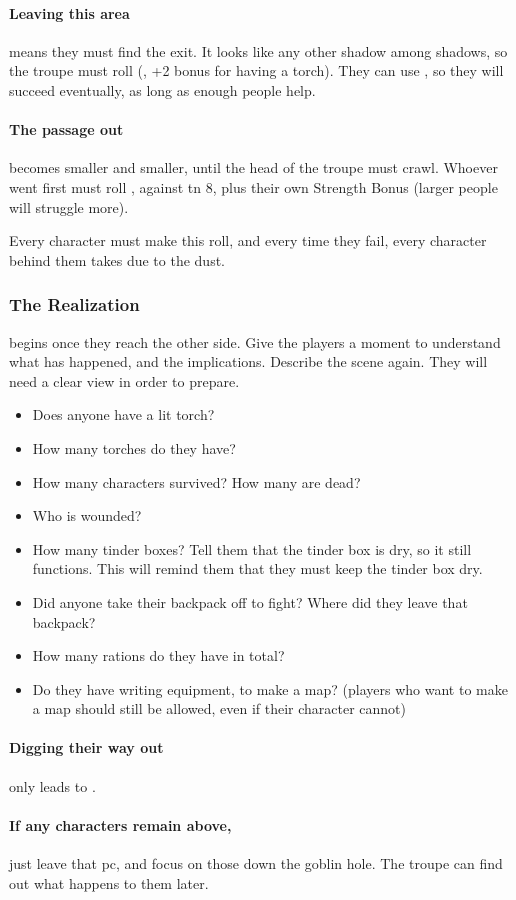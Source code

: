 \begin{multicols}{2}
\paragraph{Leaving this area}
means they must find the exit.
It looks like any other shadow among shadows, so the troupe must roll  (\tn[10], +2 bonus for having a torch).
They can use , so they will succeed eventually, as long as enough people help.

\paragraph{The passage out}
becomes smaller and smaller, until the head of the troupe must crawl.
Whoever went first must roll , against \gls{tn} 8, plus their own Strength Bonus (larger people will struggle more).

Every character must make this roll, and every time they fail, every character behind them takes  due to the dust.

\subsubsection{The Realization}
begins once they reach the other side.
Give the players a moment to understand what has happened, and the implications.
Describe the scene again.
They will need a clear view in order to prepare.

\begin{itemize}
  \item
  Does anyone have a lit torch?
  \item
  How many torches do they have?
  \item
  How many characters survived?
  How many are dead?
  \item
  Who is wounded?
  \item
  How many tinder boxes?
  Tell them that the tinder box is dry, so it still functions.
  This will remind them that they must keep the tinder box dry.
  \item
  Did anyone take their backpack off to fight?
  Where did they leave that backpack?
  \item
  How many rations do they have in total?
  \item
  Do they have writing equipment, to make a map?
  (players who want to make a map should still be allowed, even if their character cannot)
\end{itemize}

\paragraph{Digging their way out}
only leads to .

\paragraph{If any characters remain above,}
just leave that \gls{pc}, and focus on those down the goblin hole.
The troupe can find out what happens to them later.

\end{multicols}
